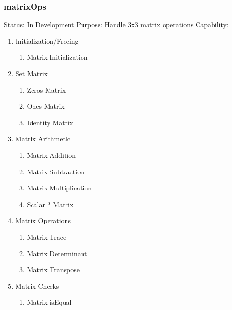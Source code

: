 \documentclass{article}
\begin{document}
			\subsubsection{matrixOps}
				Status: In Development \newline
				Purpose: Handle 3x3 matrix operations \newline
				Capability: 
				\begin{enumerate}
					\item Initialization/Freeing
					\begin{enumerate}
						\item Matrix Initialization
					\end{enumerate}
					\item Set Matrix
					\begin{enumerate}
						\item Zeros Matrix
						\item Ones Matrix
						\item Identity Matrix
					\end{enumerate}
					\item Matrix Arithmetic
					\begin{enumerate}
						\item Matrix Addition
						\item Matrix Subtraction
						\item Matrix Multiplication
						\item Scalar * Matrix
					\end{enumerate}
					\item Matrix Operations
					\begin{enumerate}
						\item Matrix Trace
						\item Matrix Determinant
						\item Matrix Transpose
					\end{enumerate}
					\item Matrix Checks
					\begin{enumerate}
						\item Matrix isEqual
					\end{enumerate}
				\end{enumerate}
\end{document}
